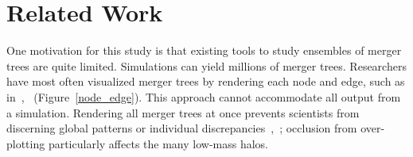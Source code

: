 
    
\section{Related Work}
\label{relatedwork}
One motivation for this study is that existing tools to study ensembles of merger trees are quite limited. Simulations can yield millions of merger trees. Researchers have most often visualized merger trees by rendering each node and edge, such as in~\cite{scivis15},~\cite{Shan:2014} (Figure~\ref{node_edge}). This approach cannot accommodate all output from a simulation. Rendering all merger trees at once prevents scientists from discerning global patterns or individual discrepancies~\cite{ellis2007},~\cite{elmqvist2010}; occlusion from over-plotting particularly affects the many low-mass halos. 

